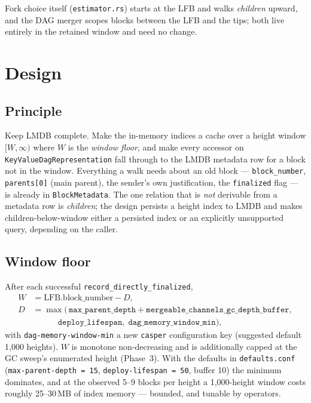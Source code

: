 \documentclass[11pt]{article}
\newcommand{\code}[1]{\texttt{#1}}
\begin{document}
Fork choice itself (\code{estimator.rs}) starts at the LFB and walks
\emph{children} upward, and the DAG merger scopes blocks between the LFB and
the tips; both live entirely in the retained window and need no change.

\section{Design}

\subsection{Principle}

Keep LMDB complete. Make the in-memory indices a cache over a height window
$[W, \infty)$ where $W$ is the \emph{window floor}, and make every accessor
on \code{KeyValueDagRepresentation} fall through to the LMDB metadata row for a
block not in the window. Everything a walk needs about an old block ---
\code{block\_number}, \code{parents[0]} (main parent), the sender's own
justification, the \code{finalized} flag --- is already in
\code{BlockMetadata}. The one relation that is \emph{not} derivable from a
metadata row is \emph{children}; the design persists a height index to LMDB
and makes children-below-window either a persisted index or an explicitly
unsupported query, depending on the caller.

\subsection{Window floor}

After each successful \code{record\_directly\_finalized},
\begin{align*}
  W &= \mathrm{LFB.block\_number} - D,\\
  D &= \max\bigl(\,\code{max\_parent\_depth} + \code{mergeable\_channels\_gc\_depth\_buffer},\\
    &\qquad\quad \code{deploy\_lifespan},\; \code{dag\_memory\_window\_min}\bigr),
\end{align*}
with \code{dag-memory-window-min} a new \code{casper} configuration key
(suggested default 1{,}000 heights). $W$ is monotone non-decreasing and is
additionally capped at the GC sweep's enumerated height (Phase~3). With the
defaults in \code{defaults.conf} (\code{max-parent-depth = 15},
\code{deploy-lifespan = 50}, buffer 10) the minimum dominates, and at the
observed 5--9 blocks per height a 1{,}000-height window costs roughly
25--30\,MB of index memory --- bounded, and tunable by operators.
\end{document}
